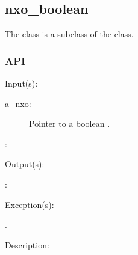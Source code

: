 %
%
%
%
%              

\subsection{nxo\_boolean}
\label{nxo_boolean}

The  class is a subclass of the  class.

\subsubsection{API}
\begin{capi}
\label{nxo_boolean_}
	\begin{capilist}
	\item[Input(s): ]
		\begin{description}\item[]
		\item[a\_nxo: ]
			Pointer to a boolean .
		\item[: ]
		\end{description}
	\item[Output(s): ]
		\begin{description}\item[]
		\item[: ]
		\end{description}
	\item[Exception(s): ]
		\begin{description}\item[]
		\item[.]
		\end{description}
	\item[Description: ]
	\end{capilist}
\end{capi}
